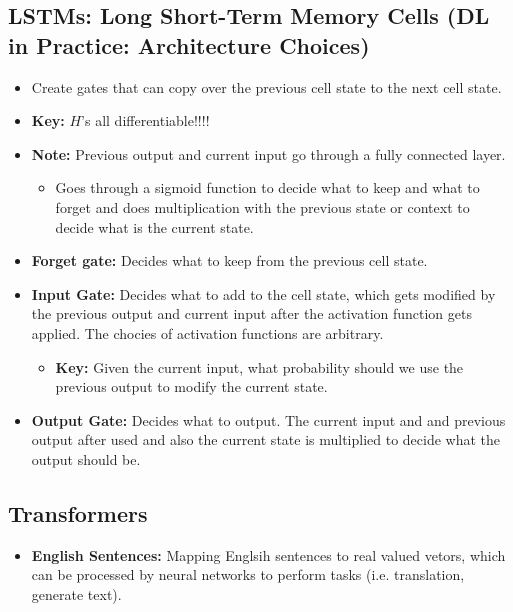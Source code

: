 \subsection{LSTMs: Long Short-Term Memory Cells (DL in Practice: Architecture Choices)}
\begin{summary}
    \begin{itemize}
        \item Create gates that can copy over the previous cell state to the next cell state. 
        \item \textbf{Key:} $H$'s all differentiable!!!!
        \item \textbf{Note:} Previous output and current input go through a fully connected layer. 
        \begin{itemize}
            \item Goes through a sigmoid function to decide what to keep and what to forget and does multiplication with the previous state or context to decide what is the current state. 
        \end{itemize}
        \item \textbf{Forget gate:} Decides what to keep from the previous cell state.
        \item \textbf{Input Gate:} Decides what to add to the cell state, which gets modified by the previous output and current input after the activation function gets applied. The chocies of activation functions are arbitrary. 
        \begin{itemize}
            \item \textbf{Key:} Given the current input, what probability should we use the previous output to modify the current state. 
        \end{itemize}
        \item \textbf{Output Gate:} Decides what to output. The current input and and previous output after used and also the current state is multiplied to decide what the output should be. 
    \end{itemize}

\end{summary}

\subsection{Transformers}
\begin{summary}
    \begin{itemize}
        \item \textbf{English Sentences:} Mapping Englsih sentences to real valued vetors, which can be processed by neural networks to perform tasks (i.e. translation, generate text).
    \end{itemize}
\end{summary}

